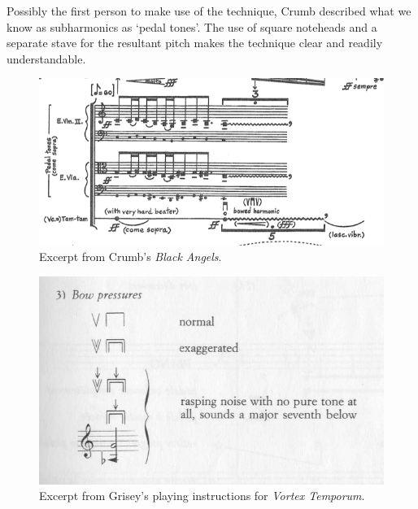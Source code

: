 Possibly the first person to make use of the technique, Crumb described what we know as subharmonics as `pedal tones'.\autocite{crumbBlackAngelsImages1971} 
The use of square noteheads and a separate stave for the resultant pitch makes the technique clear and readily understandable.
\begin{figure}
    \includegraphics[width=\linewidth]{./resources/crumbBlackAngels.png}
    \caption{Excerpt from Crumb's \emph{Black Angels}.\autocite[]{crumbBlackAngels1995}}
\label{fig:Excerpt from Crumb's Black Angels}
  \end{figure}

\begin{figure}
    \includegraphics[width=\linewidth]{./resources/griseyVortexTemporum.jpg}
    \caption{Excerpt from Grisey's playing instructions for \emph{Vortex Temporum}.\autocite[]{griseyVortexTemporum}}
\label{fig:Excerpt from Grisey's playing instructions for Vortex Temporum}
  \end{figure}


